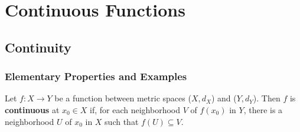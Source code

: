 \part{Continuous Functions}

\chapter{Continuity}

\section{Elementary Properties and Examples}

Let \(f \colon X \to Y \) be a function between metric spaces (\(X, d_X\)) and 
(\(Y, d_Y\)). Then \(f\) is \textbf{continuous} at \(x_0 \in X\) if, for each 
neighborhood \(V\) of \(f\left(x_0\right)\) in \(Y\), there is a neighborhood
\(U\) of \(x_0\) in \(X\) such that \(f\left(U\right) \subseteq V\). 

